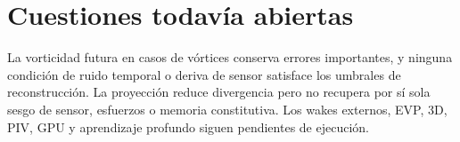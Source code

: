 \section{Cuestiones todavía abiertas}
La vorticidad futura en casos de vórtices conserva errores importantes, y ninguna condición de ruido temporal o deriva de sensor satisface los umbrales de reconstrucción. La proyección reduce divergencia pero no recupera por sí sola sesgo de sensor, esfuerzos o memoria constitutiva. Los wakes externos, EVP, 3D, PIV, GPU y aprendizaje profundo siguen pendientes de ejecución.
